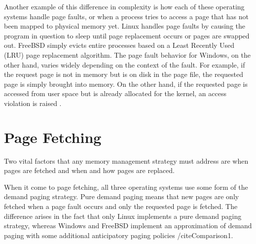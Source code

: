 \documentclass[onecolumn, draftclsnofoot,10pt, compsoc]{IEEEtran}
\begin{document}
Another example of this difference in complexity is how each of these operating systems handle page faults, or when a process tries to access a page that has not been mapped to physical memory yet. Linux handles page faults by causing the program in question to sleep until page replacement occurs or pages are swapped out. FreeBSD simply evicts entire processes based on a Least Recently Used (LRU) page replacement algorithm. The page fault behavior for Windows, on the other hand, varies widely depending on the context of the fault. For example, if the request page is not in memory but is on disk in the page file, the requested page is simply brought into memory. On the other hand, if the requested page is accessed from user space but is already allocated for the kernel, an access violation is raised \cite{WindowsInternals2}. 

\section{Page Fetching}
Two vital factors that any memory management strategy must address are when pages are fetched and when and how pages are replaced. 

When it come to page fetching, all three operating systems use some form of the demand paging strategy. Pure demand paging means that new pages are only fetched when a page fault occurs and only the requested page is fetched. The difference arises in the fact that only Linux implements a pure demand paging strategy, whereas Windows and FreeBSD implement an approximation of demand paging with some additional anticipatory paging policies /cite{Comparison1}.
\end{document}
